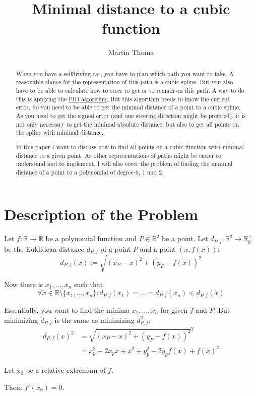 \documentclass[a4paper]{scrartcl}
\title{Minimal distance to a cubic function}
\author{Martin Thoma}
\theoremstyle{break}
\theoremstyle{nonumberplain}
\def\mdr{\ensuremath{\mathbb{R}}}
\begin{document}
\maketitle
\begin{abstract}
When you have a selfdriving car, you have to plan which path you
want to take. A reasonable choice for the representation of this
path is a cubic spline. But you also have to be able to calculate
how to steer to get or to remain on this path. A way to do this
is applying the \href{https://en.wikipedia.org/wiki/PID_algorithm}{PID algorithm}.
But this algorithm needs to know the current error. So you need to 
be able to get the minimal distance of a point to a cubic spline.
As you need to get the signed error (and one steering direction might
be prefered), it is not only necessary to
get the minimal absolute distance, but also to get all points
on the spline with minimal distance.

In this paper I want to discuss how to find all points on a cubic 
function with minimal distance to a given point.
As other representations of paths might be easier to understand and
to implement, I will also cover the problem of finding the minimal
distance of a point to a polynomial of degree 0, 1 and 2.
\end{abstract}

\section{Description of the Problem}
Let $f: \mdr \rightarrow \mdr$ be a polynomial function and $P \in \mdr^2$
be a point. Let $d_{P,f}: \mdr^2 \rightarrow \mdr_0^+$
be the Euklidean distance $d_{P,f}$ of a point $P$ and a point $\left (x, f(x) \right )$:
\[d_{P,f} (x) := \sqrt{(x_P - x)^2 + (y_P - f(x))^2}\]

Now there is  $x_1, \dots, x_n$ such that 
\[\forall \tilde x \in \mathbb{R} \setminus \{x_1, \dots, x_n\}: d_{P,f}(x_1) = \dots = d_{P,f}(x_n) < d_{P,f}(\tilde x)\]

Essentially, you want to find the minima $x_1, \dots, x_n$ for given 
$f$ and $P$.
But minimizing $d_{P,f}$ is the same as minimizing $d_{P,f}^2$:
\begin{align}
    d_{P,f}(x)^2    &= \sqrt{(x_P - x)^2 + (y_P - f(x))^2}^2\\
                &= x_p^2 - 2x_p x + x^2 + y_p^2 - 2y_p f(x) + f(x)^2
\end{align}

\begin{theorem}\label{thm:required-extremum-property}
    Let $x_0$ be a relative extremum of $f$.

    Then: $f'(x_0) = 0$.
\end{theorem}
\end{document}
